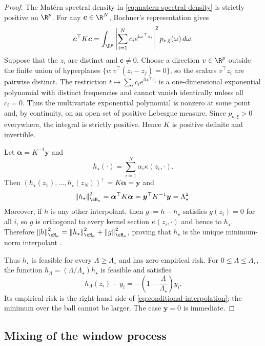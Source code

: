 \begin{proof}
The Mat\'ern spectral density in \cref{eq:matern-spectral-density} is strictly
positive on \(\R^p\). For any \(\bm c\in\R^N\), Bochner's representation gives
\[
    \bm c^\top K\bm c
    =
    \int_{\R^p}
    \left|\sum_{i=1}^N c_i e^{\ii\omega^\top z_i}\right|^2
    p_{\nu,\xi}(\omega)\,d\omega.
\]
Suppose that the \(z_i\) are distinct and \(\bm c\neq0\). Choose a direction
\(v\in\R^p\) outside the finite union of hyperplanes
\(\{v:v^\top(z_i-z_j)=0\}\), so the scalars \(v^\top z_i\) are pairwise
distinct. The restriction
\(t\mapsto\sum_i c_i e^{\ii t v^\top z_i}\) is a one-dimensional exponential
polynomial with distinct frequencies and cannot vanish identically unless all
\(c_i=0\). Thus the multivariate exponential polynomial is nonzero at some
point and, by continuity, on an open set of positive Lebesgue measure. Since
\(p_{\nu,\xi}>0\) everywhere, the integral is strictly positive. Hence \(K\)
is positive definite and invertible.

Let \(\bm\alpha=K^{-1}\bm y\) and
\[
    h_\star(\cdot)=\sum_{i=1}^N\alpha_i\kappa(z_i,\cdot).
\]
Then \((h_\star(z_1),\ldots,h_\star(z_N))^\top=K\bm\alpha=\bm y\) and
\[
    \norm{h_\star}_{\cH_\kappa}^2
    =\bm\alpha^\top K\bm\alpha
    =\bm y^\top K^{-1}\bm y
    =\Lambda_\star^2.
\]
Moreover, if \(h\) is any other interpolant, then
\(g:=h-h_\star\) satisfies \(g(z_i)=0\) for all \(i\), so
\(g\) is orthogonal to every kernel section \(\kappa(z_i,\cdot)\) and hence to
\(h_\star\). Therefore
\(\norm{h}_{\cH_\kappa}^2=\norm{h_\star}_{\cH_\kappa}^2+
\norm{g}_{\cH_\kappa}^2\), proving that \(h_\star\) is the unique minimum-norm
interpolant \citep{Aronszajn1950,KimeldorfWahba1971}.

Thus \(h_\star\) is feasible for every \(\Lambda\geq\Lambda_\star\) and has
zero empirical risk. For \(0\leq\Lambda\leq\Lambda_\star\), the function
\(h_\Lambda=(\Lambda/\Lambda_\star)h_\star\) is feasible and satisfies
\[
    h_\Lambda(z_i)-y_i
    =-\left(1-\frac{\Lambda}{\Lambda_\star}\right)y_i.
\]
Its empirical risk is the right-hand side of
\cref{eq:conditional-interpolation}; the minimum over the ball cannot be
larger. The case \(\bm y=0\) is immediate.
\end{proof}

\subsection{Mixing of the window process}

